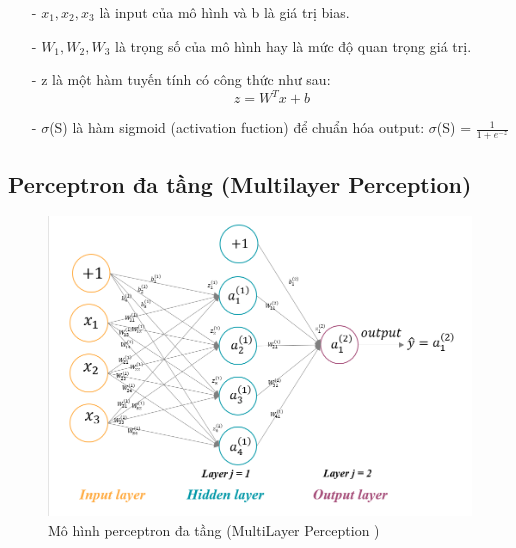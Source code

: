 \documentclass{report}
\newcommand\tab[1][1.25cm]{\hspace*{#1}}
\begin{document}
            \begin{enumerate}
                \item [- ] $x_1, x_2, x_3$ là input của mô hình và b là giá trị bias.
                \item [- ] $W_1, W_2, W_3$ là trọng số của mô hình hay là mức độ quan trọng giá trị.
                \item [- ] z là một hàm tuyến tính có công thức như sau: $$z = W^T x + b$$ 
                \item [- ] $\sigma$(S) là hàm sigmoid (activation fuction) để chuẩn hóa output:
                \vspace{0.2cm}\newline\tab[6cm] $\sigma$(S) = $\frac{1}{1 + e^{-z}}$
            \end{enumerate}

\pagebreak
        \fontsize{15}{10}\selectfont
        \subsection{Perceptron đa tầng (Multilayer Perception)}
            \begin{center}
                \begin{figure}[htp]
                    \begin{center}
                        \includegraphics[scale = 0.6]{image/MLP_1.png}
                        \caption{Mô hình perceptron đa tầng (MultiLayer Perception )}
                    \end{center}
                \end{figure}
            \end{center}
            
\end{document}
